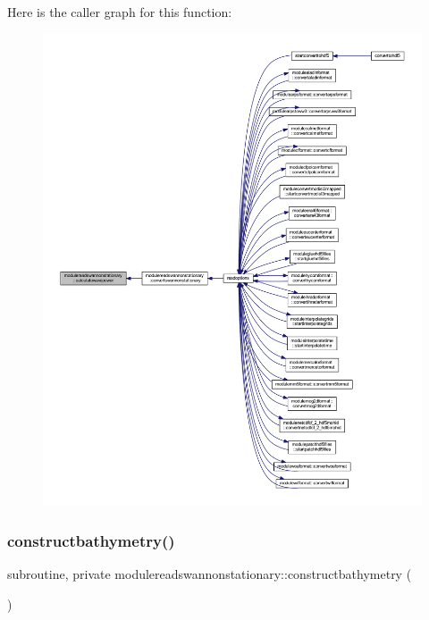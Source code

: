 Here is the caller graph for this function\+:\nopagebreak
\begin{figure}[H]
\begin{center}
\leavevmode
\includegraphics[width=350pt]{namespacemodulereadswannonstationary_a8c548e44bcbe106ea2fb8ef9f9aae7a1_icgraph}
\end{center}
\end{figure}
\mbox{\label{namespacemodulereadswannonstationary_a75a35cae0f8c8f39af652fdec1a65e65}} 
\subsubsection{\texorpdfstring{constructbathymetry()}{constructbathymetry()}}
{\footnotesize\ttfamily subroutine, private modulereadswannonstationary\+::constructbathymetry (\begin{DoxyParamCaption}{ }\end{DoxyParamCaption})\hspace{0.3cm}{\ttfamily [private]}}

